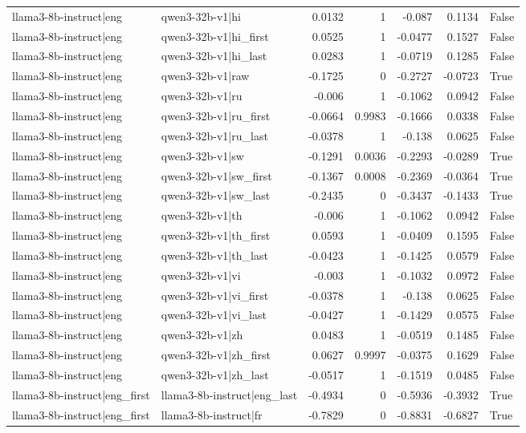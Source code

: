 \begin{table}
\begin{tabular}{l l r r r r l}
llama3-8b-instruct|eng & qwen3-32b-v1|hi & 0.0132 & 1 & -0.087 & 0.1134 & False \\
llama3-8b-instruct|eng & qwen3-32b-v1|hi_first & 0.0525 & 1 & -0.0477 & 0.1527 & False \\
llama3-8b-instruct|eng & qwen3-32b-v1|hi_last & 0.0283 & 1 & -0.0719 & 0.1285 & False \\
llama3-8b-instruct|eng & qwen3-32b-v1|raw & -0.1725 & 0 & -0.2727 & -0.0723 & True \\
llama3-8b-instruct|eng & qwen3-32b-v1|ru & -0.006 & 1 & -0.1062 & 0.0942 & False \\
llama3-8b-instruct|eng & qwen3-32b-v1|ru_first & -0.0664 & 0.9983 & -0.1666 & 0.0338 & False \\
llama3-8b-instruct|eng & qwen3-32b-v1|ru_last & -0.0378 & 1 & -0.138 & 0.0625 & False \\
llama3-8b-instruct|eng & qwen3-32b-v1|sw & -0.1291 & 0.0036 & -0.2293 & -0.0289 & True \\
llama3-8b-instruct|eng & qwen3-32b-v1|sw_first & -0.1367 & 0.0008 & -0.2369 & -0.0364 & True \\
llama3-8b-instruct|eng & qwen3-32b-v1|sw_last & -0.2435 & 0 & -0.3437 & -0.1433 & True \\
llama3-8b-instruct|eng & qwen3-32b-v1|th & -0.006 & 1 & -0.1062 & 0.0942 & False \\
llama3-8b-instruct|eng & qwen3-32b-v1|th_first & 0.0593 & 1 & -0.0409 & 0.1595 & False \\
llama3-8b-instruct|eng & qwen3-32b-v1|th_last & -0.0423 & 1 & -0.1425 & 0.0579 & False \\
llama3-8b-instruct|eng & qwen3-32b-v1|vi & -0.003 & 1 & -0.1032 & 0.0972 & False \\
llama3-8b-instruct|eng & qwen3-32b-v1|vi_first & -0.0378 & 1 & -0.138 & 0.0625 & False \\
llama3-8b-instruct|eng & qwen3-32b-v1|vi_last & -0.0427 & 1 & -0.1429 & 0.0575 & False \\
llama3-8b-instruct|eng & qwen3-32b-v1|zh & 0.0483 & 1 & -0.0519 & 0.1485 & False \\
llama3-8b-instruct|eng & qwen3-32b-v1|zh_first & 0.0627 & 0.9997 & -0.0375 & 0.1629 & False \\
llama3-8b-instruct|eng & qwen3-32b-v1|zh_last & -0.0517 & 1 & -0.1519 & 0.0485 & False \\
llama3-8b-instruct|eng_first & llama3-8b-instruct|eng_last & -0.4934 & 0 & -0.5936 & -0.3932 & True \\
llama3-8b-instruct|eng_first & llama3-8b-instruct|fr & -0.7829 & 0 & -0.8831 & -0.6827 & True \\

\end{tabular}
\end{table}
